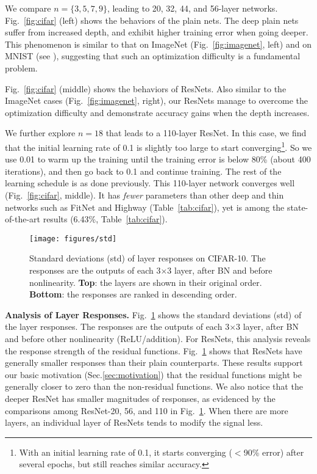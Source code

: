 \documentclass{article}
\begin{document}
We compare $n=\{3,5,7,9\}$, leading to 20, 32, 44, and 56-layer networks.
Fig.~\ref{fig:cifar} (left) shows the behaviors of the plain nets. The deep plain nets suffer from increased depth, and exhibit higher training error when going deeper. This phenomenon is similar to that on ImageNet (Fig.~\ref{fig:imagenet}, left) and on MNIST (see \cite{Srivastava2015}), suggesting that such an optimization difficulty is a fundamental problem.

Fig.~\ref{fig:cifar} (middle) shows the behaviors of ResNets. Also similar to the ImageNet cases (Fig.~\ref{fig:imagenet}, right), our ResNets manage to overcome the optimization difficulty and demonstrate accuracy gains when the depth increases.

We further explore $n=18$ that leads to a 110-layer ResNet. In this case, we find that the initial learning rate of 0.1 is slightly too large to start converging\footnote{With an initial learning rate of 0.1, it starts converging ($<$90\% error) after several epochs, but still reaches similar accuracy.}. So we use 0.01 to warm up the training until the training error is below 80\% (about 400 iterations), and then go back to 0.1 and continue training. The rest of the learning schedule is as done previously. This 110-layer network converges well (Fig.~\ref{fig:cifar}, middle). It has \emph{fewer} parameters than other deep and thin networks such as FitNet \cite{Romero2015} and Highway \cite{Srivastava2015} (Table~\ref{tab:cifar}), yet is among the state-of-the-art results (6.43\%, Table~\ref{tab:cifar}).

\begin{figure}[t]
\begin{center}
\texttt{[image: figures/std]}
\end{center}
\vspace{-1.5em}
\caption{Standard deviations (std) of layer responses on CIFAR-10. The responses are the outputs of each 3$\times$3 layer, after BN and before nonlinearity. \textbf{Top}: the layers are shown in their original order. \textbf{Bottom}: the responses are ranked in descending order.}
\label{fig:std}
\end{figure}


\vspace{6pt}
\noindent\textbf{Analysis of Layer Responses.}
Fig.~\ref{fig:std} shows the standard deviations (std) of the layer responses. The responses are the outputs of each 3$\times$3 layer, after BN and before other nonlinearity (ReLU/addition). For ResNets, this analysis reveals the response strength of the residual functions.
Fig.~\ref{fig:std} shows that ResNets have generally smaller responses than their plain counterparts. These results support our basic motivation (Sec.\ref{sec:motivation}) that the residual functions might be generally closer to zero than the non-residual functions.
We also notice that the deeper ResNet has smaller magnitudes of responses, as evidenced by the comparisons among ResNet-20, 56, and 110 in Fig.~\ref{fig:std}. When there are more layers, an individual layer of ResNets tends to modify the signal less.
\end{document}
